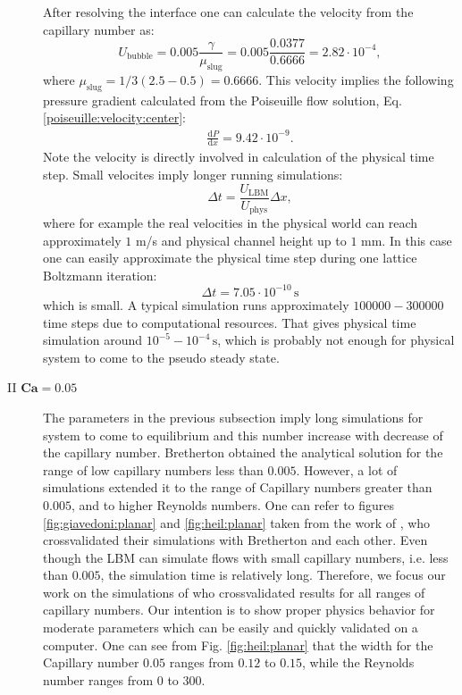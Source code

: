 \documentclass{article}
\begin{document}
\begin{description}
After resolving the interface one can  calculate the
  velocity from the capillary number as:
  \begin{equation}
  U_{\mathrm{bubble}}=0.005 \frac{\gamma}{\mu_{\mathrm{slug}}}=0.005
\frac{0.0377}{0.6666}=2.82 \cdot10^{-4},
  \end{equation}
  where $\mu_{\mathrm{slug}}=1/3 (2.5-0.5)=0.6666$.
  This velocity implies the following pressure gradient calculated from the
  Poiseuille flow solution, Eq. \ref{poiseuille:velocity:center}: 
  \begin{equation}
  \begin{aligned}
  \frac{\mathrm{d}P}{\mathrm{d}x}=9.42 \cdot 10^{-9}.
  \end{aligned}
  \end{equation}
Note the velocity is directly
involved in calculation of the physical time step. Small velocites imply longer running simulations:
\begin{equation}
\Delta t =\frac{U_{\mathrm{LBM}}}{U_{\mathrm{phys}}} \Delta x ,
\end{equation}
where for example the real velocities in the physical world can reach
approximately $1$ m/s and physical channel height up to $1$ mm. In this case one
can easily approximate the physical time step during one lattice Boltzmann iteration:
\begin{equation}
\Delta t = 7.05 \cdot 10^{-10} \,\mathrm{s}
\end{equation}
which is small. A typical simulation runs approximately
$100000-300000$ time steps due to computational resources. That gives 
physical time simulation around $10^{-5}-10^{-4}\,\mathrm{s}$, which is
probably not enough for physical system to come to the pseudo steady state.

 \item[II $\bm{Ca=0.05}$] 
   The parameters in the previous subsection imply long
simulations for system to come to equilibrium and this number increase with decrease of the
capillary number. Bretherton obtained the analytical solution for the range of low capillary numbers
less than
  $0.005$. However, a lot of simulations extended it to the range of Capillary numbers greater than
$0.005$, and to higher Reynolds numbers. One can refer to figures
  \ref{fig:giavedoni:planar} and \ref{fig:heil:planar} taken from the work of
  \citet{giavedoni-numerical,heil-bretherton}, who crossvalidated their
  simulations with Bretherton and each other. Even though the LBM can simulate
flows with small capillary numbers, i.e. less than $0.005$, the simulation time
is relatively long. Therefore, we focus our work on the simulations of
\citet{giavedoni-numerical} who crossvalidated
results for all ranges of capillary numbers.  Our intention is
  to show proper physics behavior for moderate parameters
which
  can be easily and quickly validated on a computer.
  One can see from Fig. \ref{fig:heil:planar} that the width for the
  Capillary number $0.05$ ranges from $0.12$ to $0.15$, while the Reynolds
  number ranges from $0$ to $300$.


\end{description}
\end{document}
